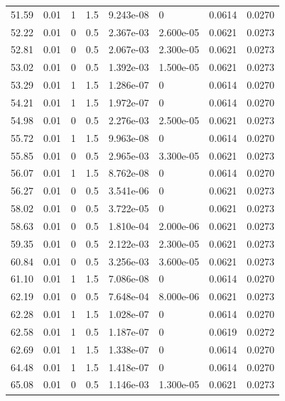 \documentclass[preview]{standalone}
\begin{document}
{{{\begin{tabular}{L{1.2cm}C{1.2cm} C{0.3cm}C{0.5cm} C{1.4cm}C{1.4cm} C{1.4cm}C{1.4cm}}
  51.59  &  0.01  & 1     & 1.5 &  9.243e-08  & 0  & 0.0614 &  0.0270   \\ 
  52.22  &  0.01  & 0     & 0.5 &  2.367e-03  & 2.600e-05  & 0.0621 &  0.0273   \\ 
  52.81  &  0.01  & 0     & 0.5 &  2.067e-03  & 2.300e-05  & 0.0621 &  0.0273   \\ 
  53.02  &  0.01  & 0     & 0.5 &  1.392e-03  & 1.500e-05  & 0.0621 &  0.0273   \\ 
  53.29  &  0.01  & 1     & 1.5 &  1.286e-07  & 0  & 0.0614 &  0.0270   \\ 
  54.21  &  0.01  & 1     & 1.5 &  1.972e-07  & 0  & 0.0614 &  0.0270   \\ 
  54.98  &  0.01  & 0     & 0.5 &  2.276e-03  & 2.500e-05  & 0.0621 &  0.0273   \\ 
  55.72  &  0.01  & 1     & 1.5 &  9.963e-08  & 0  & 0.0614 &  0.0270   \\ 
  55.85  &  0.01  & 0     & 0.5 &  2.965e-03  & 3.300e-05  & 0.0621 &  0.0273   \\ 
  56.07  &  0.01  & 1     & 1.5 &  8.762e-08  & 0  & 0.0614 &  0.0270   \\ 
  56.27  &  0.01  & 0     & 0.5 &  3.541e-06  & 0  & 0.0621 &  0.0273   \\ 
  58.02  &  0.01  & 0     & 0.5 &  3.722e-05  & 0  & 0.0621 &  0.0273   \\ 
  58.63  &  0.01  & 0     & 0.5 &  1.810e-04  & 2.000e-06  & 0.0621 &  0.0273   \\ 
  59.35  &  0.01  & 0     & 0.5 &  2.122e-03  & 2.300e-05  & 0.0621 &  0.0273   \\ 
  60.84  &  0.01  & 0     & 0.5 &  3.256e-03  & 3.600e-05  & 0.0621 &  0.0273   \\ 
  61.10  &  0.01  & 1     & 1.5 &  7.086e-08  & 0  & 0.0614 &  0.0270   \\ 
  62.19  &  0.01  & 0     & 0.5 &  7.648e-04  & 8.000e-06  & 0.0621 &  0.0273   \\ 
  62.28  &  0.01  & 1     & 1.5 &  1.028e-07  & 0  & 0.0614 &  0.0270   \\ 
  62.58  &  0.01  & 1     & 0.5 &  1.187e-07  & 0  & 0.0619 &  0.0272   \\ 
  62.69  &  0.01  & 1     & 1.5 &  1.338e-07  & 0  & 0.0614 &  0.0270   \\ 
  64.48  &  0.01  & 1     & 1.5 &  1.418e-07  & 0  & 0.0614 &  0.0270   \\ 
  65.08  &  0.01  & 0     & 0.5 &  1.146e-03  & 1.300e-05  & 0.0621 &  0.0273   \\ 

\end{tabular}}}}
\end{document}
